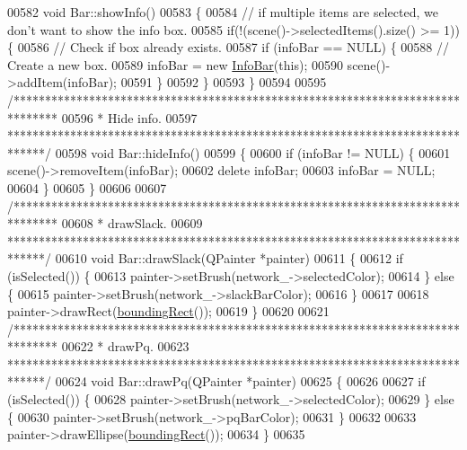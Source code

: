 \begin{DoxyCode}
00582 \textcolor{keywordtype}{void} Bar::showInfo()
00583 \{
00584   \textcolor{comment}{// if multiple items are selected, we don't want to show the info box.}
00585   \textcolor{keywordflow}{if}(!(scene()->selectedItems().size() >= 1)) \{
00586     \textcolor{comment}{// Check if box already exists.}
00587     \textcolor{keywordflow}{if} (infoBar == NULL) \{
00588       \textcolor{comment}{// Create a new box.}
00589       infoBar = \textcolor{keyword}{new} \hyperlink{class_info_bar}{InfoBar}(\textcolor{keyword}{this});
00590       scene()->addItem(infoBar);
00591     \}
00592   \}
00593 \}
00594 
00595 \textcolor{comment}{/*******************************************************************************}
00596 \textcolor{comment}{ * Hide info.}
00597 \textcolor{comment}{ ******************************************************************************/}
00598 \textcolor{keywordtype}{void} Bar::hideInfo()
00599 \{
00600   \textcolor{keywordflow}{if} (infoBar != NULL) \{
00601     scene()->removeItem(infoBar);
00602     \textcolor{keyword}{delete} infoBar;
00603     infoBar = NULL;
00604   \}
00605 \}
00606 
00607 \textcolor{comment}{/*******************************************************************************}
00608 \textcolor{comment}{ * drawSlack.}
00609 \textcolor{comment}{ ******************************************************************************/}
00610 \textcolor{keywordtype}{void} Bar::drawSlack(QPainter *painter)
00611 \{
00612   \textcolor{keywordflow}{if} (isSelected()) \{
00613     painter->setBrush(network\_->selectedColor);
00614   \} \textcolor{keywordflow}{else} \{
00615     painter->setBrush(network\_->slackBarColor);
00616   \}
00617 
00618   painter->drawRect(\hyperlink{group___models_ga8279d8109019cc7e139e2023690496be}{boundingRect}());
00619 \}
00620 
00621 \textcolor{comment}{/*******************************************************************************}
00622 \textcolor{comment}{ * drawPq.}
00623 \textcolor{comment}{ ******************************************************************************/}
00624 \textcolor{keywordtype}{void} Bar::drawPq(QPainter *painter)
00625 \{
00626 
00627   \textcolor{keywordflow}{if} (isSelected()) \{
00628     painter->setBrush(network\_->selectedColor);
00629   \} \textcolor{keywordflow}{else} \{
00630     painter->setBrush(network\_->pqBarColor);
00631   \}
00632 
00633   painter->drawEllipse(\hyperlink{group___models_ga8279d8109019cc7e139e2023690496be}{boundingRect}());
00634 \}
00635 
\end{DoxyCode}
